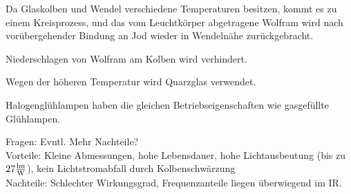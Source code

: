 \begin{enumerate}
    Da Glaskolben und Wendel verschiedene Temperaturen besitzen, kommt es zu einem
    Kreisprozess, und das vom Leuchtkörper abgetragene Wolfram wird nach vorübergehender
    Bindung an Jod wieder in Wendelnähe zurückgebracht.
    
    Niederschlagen von Wolfram am Kolben wird verhindert.
    
    Wegen der höheren Temperatur wird Quarzglas verwendet.
    
    Halogenglühlampen haben die gleichen Betriebseigenschaften wie gasgefüllte Glühlampen.

            Fragen: Evntl. Mehr Nachteile?\\
            Vorteile: Kleine Abmessungen, hohe Lebensdauer, hohe Lichtausbeutung (bis zu $27\frac{\textnormal{lm}}{\textnormal{W}}$), kein Lichtstromabfall durch Kolbenschwärzung\\
            Nachteile: Schlechter Wirkungsgrad, Frequenzanteile liegen überwiegend im IR.
\end{enumerate}